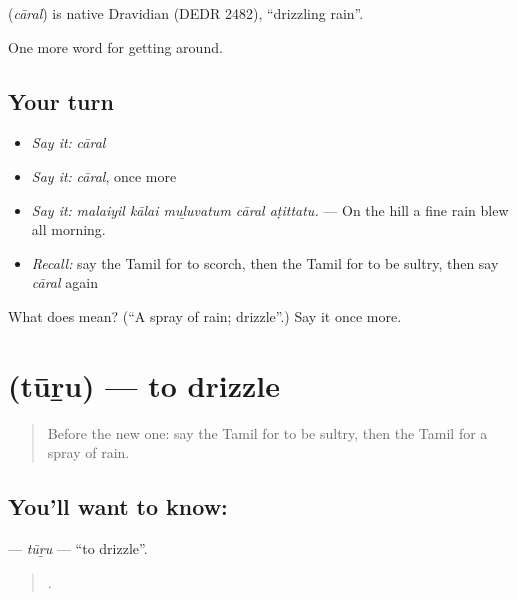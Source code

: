 \begin{cousinweb}
\textbf{} (\emph{cāral}) is native Dravidian (DEDR 2482), \textquotedblleft{}drizzling rain\textquotedblright{}.
\end{cousinweb}

\begin{grammarlens}[title={What you've built}]
One more word for getting around.
\end{grammarlens}

\subsection*{Your turn}
\begin{itemize}
\raggedright
  \item \emph{Say it:} \emph{cāral}
  \item \emph{Say it:} \emph{cāral}, once more
  \item \emph{Say it:} \emph{malaiyil kālai muḻuvatum cāral aṭittatu.} — On the hill a fine rain blew all morning.
  \item \emph{Recall:} say the Tamil for to scorch, then the Tamil for to be sultry, then say \emph{cāral} again
\end{itemize}

\begin{tcolorbox}[breakable,colback=teal!4,colframe=teal!35!black,title={Before you move on}]
What does  mean? (\textquotedblleft{}A spray of rain; drizzle\textquotedblright{}.) Say it once more.
\end{tcolorbox}
\section[\texorpdfstring{\ta{தூறு} (tūṟu)}{தூறு (tūṟu)}]{ (tūṟu) — to drizzle}

\label{lesson:TA-C428-turu}



\begin{quote}
Before the new one: say the Tamil for to be sultry, then the Tamil for a spray of rain.
\end{quote}

\subsection*{You'll want to know: }
\textbf{} — \emph{tūṟu} — \textquotedblleft{}to drizzle\textquotedblright{}.

\begin{quote}
  .
\end{quote}

